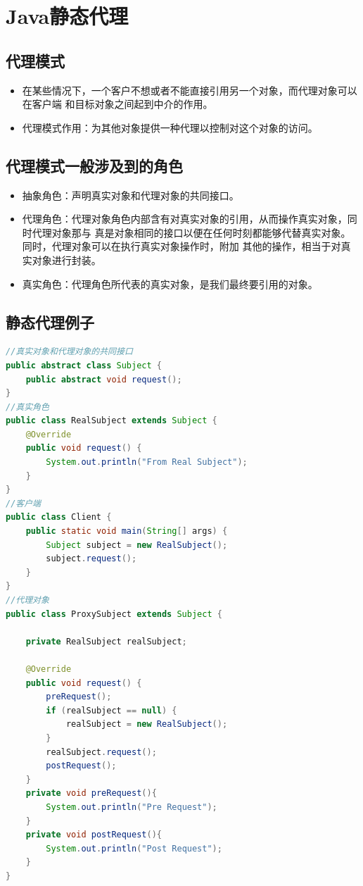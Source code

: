 \section{Java静态代理}
\subsection{代理模式}
\begin{itemize}
	\item 在某些情况下，一个客户不想或者不能直接引用另一个对象，而代理对象可以在客户端
	和目标对象之间起到中介的作用。
	\item 代理模式作用：为其他对象提供一种代理以控制对这个对象的访问。
\end{itemize}
\subsection{代理模式一般涉及到的角色}
\begin{itemize}
	\item 抽象角色：声明真实对象和代理对象的共同接口。
	\item 代理角色：代理对象角色内部含有对真实对象的引用，从而操作真实对象，同时代理对象那与
	真是对象相同的接口以便在任何时刻都能够代替真实对象。同时，代理对象可以在执行真实对象操作时，附加
	其他的操作，相当于对真实对象进行封装。
	\item 真实角色：代理角色所代表的真实对象，是我们最终要引用的对象。
\end{itemize}
\subsection{静态代理例子}
\begin{lstlisting}[language=java]
//真实对象和代理对象的共同接口
public abstract class Subject {
	public abstract void request();
}
//真实角色
public class RealSubject extends Subject {
	@Override
	public void request() {
		System.out.println("From Real Subject");
	}
}
//客户端
public class Client {
	public static void main(String[] args) {
		Subject subject = new RealSubject();
		subject.request();
	}
}
//代理对象
public class ProxySubject extends Subject {
	
	private RealSubject realSubject;
	
	@Override
	public void request() {
		preRequest();
		if (realSubject == null) {
			realSubject = new RealSubject();
		}
		realSubject.request();
		postRequest();
	}
	private void preRequest(){
		System.out.println("Pre Request");
	}
	private void postRequest(){
		System.out.println("Post Request");
	}
}
\end{lstlisting}

